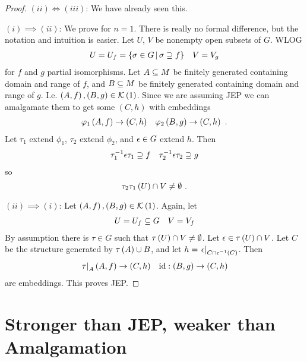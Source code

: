 \documentclass{amsart}
\begin{document}
\begin{proof}
$\left(ii\right)\iff \left(iii\right)$: We have already seen this. 

$\left(i\right)\implies\left(ii\right)$: We prove for $n = 1$. There is really no
formal difference, but the notation and intuition is easier. Let $U$, $V$ be nonempty open
subsets of $G$. WLOG 
\begin{align}
U  = U_f = \left\{\sigma \in G \, \middle\vert \, \sigma \supseteq f\right\}
&&
V = V_g
\end{align}
for $f$ and $g$ partial isomorphisms. 
Let $A\subseteq M$ be finitely generated containing domain and range of $f$, and $B\subseteq M$
be finitely generated containing domain and range of $g$. I.e.
$\left(A , f\right) , \left(B , g\right)\in \mathcal{K}\left(1\right)$. 
Since we are assuming JEP we can amalgamate them to get some $\left(C , h\right)$ with
embeddings
\begin{align}
\varphi_1\left(A , f\right) \rightarrow \left(C , h\right)&&
\varphi_2\left(B , g\right) \rightarrow \left(C , h\right) \ .
\end{align}
Let $\tau_1$ extend $\phi_1$, $\tau_2$ extend $\phi_2$, and $\epsilon\in G$ extend $h$.
Then 
\begin{align}
\tau_1^{-1}\epsilon \tau_1 \supseteq f
&& \tau_2^{-1}\epsilon \tau_2 \supseteq g
\end{align}
so
\begin{equation}
\tau_2 \tau_1 \left(U\right)\cap V \neq \emptyset \ .
\end{equation}

$\left(ii\right)\implies\left(i\right)$: Let $\left(A , f\right), \left(B , g\right) \in
\mathcal{K}\left(1\right)$. Again, let
\begin{align}
U = U_f \subseteq G && V = V_f
\end{align}
By assumption there is $\tau\in G$ such that $\tau\left(U\right)\cap V\neq \emptyset$.
Let $\epsilon\in \tau\left(U\right)\cap V$.
Let $C$ be the structure generated by $\tau\left(A\right)\cup B$, and let $h =
\left.\epsilon \right\vert_{C\cap \epsilon^{-1}\left(C\right)}$. 
Then 
\begin{align}
\left.\tau \right\vert_{A}\left(A , f\right) \rightarrow \left(C , h\right) &&
\operatorname{id}: \left(B , g\right) \rightarrow \left(C , h\right)
\end{align}
are embeddings. 
This proves JEP.
\end{proof}

\section{Stronger than JEP, weaker than Amalgamation}
\end{document}
